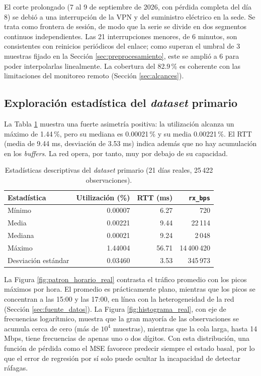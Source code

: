 \documentclass[12pt]{report}
\begin{document}
El corte prolongado (7 al 9 de septiembre de 2026, con pérdida completa del día 8) se debió a una interrupción de la VPN y del suministro eléctrico en la sede. Se trata como frontera de sesión, de modo que la serie se divide en dos segmentos continuos independientes. Las 21 interrupciones menores, de 6 minutos, son consistentes con reinicios periódicos del enlace; como superan el umbral de 3 muestras fijado en la Sección \ref{sec:preprocesamiento}, este se amplió a 6 para poder interpolarlas linealmente. La cobertura del 82.9\,\% es coherente con las limitaciones del monitoreo remoto (Sección \ref{sec:alcances}).

\subsection*{Exploración estadística del \textit{dataset} primario}

La Tabla \ref{tab:estadisticas_real} muestra una fuerte asimetría positiva: la utilización alcanza un máximo de 1.44\,\%, pero su mediana es 0.00021\,\% y su media 0.00221\,\%. El RTT (media de 9.44 ms, desviación de 3.53 ms) indica además que no hay acumulación en los \textit{buffers}. La red opera, por tanto, muy por debajo de su capacidad.

\begin{table}[H]
    \centering
    \begin{tabular}{|l|r|r|r|}
        \hline
        \textbf{Estadística} & \textbf{Utilización (\%)} & \textbf{RTT (ms)} & \textbf{\texttt{rx\_bps}} \\
        \hline
        Mínimo & 0.00007 & 6.27 & 720 \\
        Media & 0.00221 & 9.44 & 22\,114 \\
        Mediana & 0.00021 & 9.24 & 2\,048 \\
        Máximo & 1.44004 & 56.71 & 14\,400\,420 \\
        Desviación estándar & 0.03460 & 3.53 & 345\,973 \\
        \hline
    \end{tabular}
    \caption{Estadísticas descriptivas del \textit{dataset} primario (21 días reales, 25\,422 observaciones).}
    \label{tab:estadisticas_real}
\end{table}

La Figura \ref{fig:patron_horario_real} contrasta el tráfico promedio con los picos máximos por hora. El promedio es prácticamente plano, mientras que los picos se concentran a las 15:00 y las 17:00, en línea con la heterogeneidad de la red (Sección \ref{sec:fuente_datos}). La Figura \ref{fig:histograma_real}, con eje de frecuencias logarítmico, muestra que la gran mayoría de las observaciones se acumula cerca de cero (más de $10^4$ muestras), mientras que la cola larga, hasta 14 Mbps, tiene frecuencias de apenas uno o dos dígitos. Con esta distribución, una función de pérdida como el MSE favorece predecir siempre el estado basal, por lo que el error de regresión por sí solo puede ocultar la incapacidad de detectar ráfagas.
\end{document}
